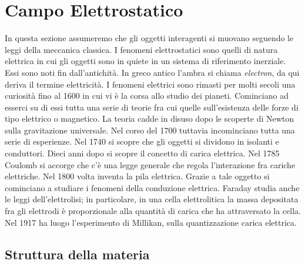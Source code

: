 \chapter{Campo Elettrostatico}

In questa sezione assumeremo che gli oggetti interagenti si muovano seguendo le leggi della meccanica classica. I fenomeni elettrostatici sono quelli di natura elettrica in cui gli oggetti sono in quiete in un sistema di riferimento inerziale. Essi sono noti fin dall'antichità. In greco antico l'ambra si chiama \emph{electron}, da qui deriva il termine elettricità. I fenomeni elettrici sono rimasti per molti secoli una curiosità fino al 1600 in cui vi è la corsa allo studio dei pianeti. Cominciano ad esserci su di essi tutta una serie di teorie fra cui quelle sull'esistenza delle forze di tipo elettrico o magnetico. La teoria cadde in disuso dopo le scoperte di Newton sulla gravitazione universale. Nel corso del 1700 tuttavia incominciano tutta una serie di esperienze. Nel 1740 si scopre che gli oggetti si dividono in isolanti e conduttori. Dieci anni dopo si scopre il concetto di carica elettrica. Nel 1785 Coulomb si accorge che c'è una legge generale che regola l'interazione fra cariche elettriche. Nel 1800 volta inventa la pila elettrica. Grazie a tale oggetto si cominciano a studiare i fenomeni della conduzione elettrica. Faraday studia anche le leggi dell'elettrolisi; in particolare, in una cella elettrolitica la massa depositata fra gli elettrodi è proporzionale alla quantità di carica che ha attraversato la cella. Nel 1917 ha luogo l'esperimento di Millikan, sulla quantizzazione carica elettrica.

\section{Struttura della materia}

